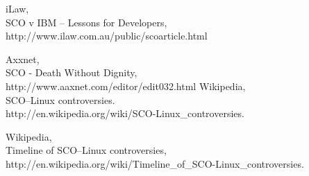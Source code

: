 \documentclass[11pt]{scrartcl}
\begin{document}
\begin{thebibliography}{9}

		iLaw,\\
		SCO v IBM – Lessons for Developers,\\
		http://www.ilaw.com.au/public/scoarticle.html

		Axxnet,\\
		SCO - Death Without Dignity,\\
		http://www.aaxnet.com/editor/edit032.html
	  Wikipedia,\\
	  SCO–Linux controversies.\\
	  http://en.wikipedia.org/wiki/SCO-Linux\_controversies.

		Wikipedia,\\
		Timeline of SCO–Linux controversies,\\
		http://en.wikipedia.org/wiki/Timeline\_of\_SCO-Linux\_controversies.

\end{thebibliography}
\end{document}
